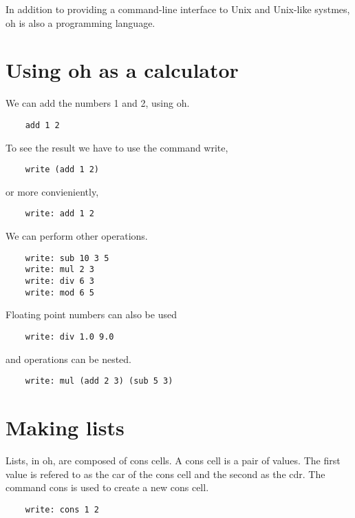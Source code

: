 \documentclass[12pt]{book}
\begin{document}
In addition to providing a command-line interface to Unix and
Unix-like systmes, oh is also a programming language.


\section{Using oh as a calculator}

We can add the numbers 1 and 2, using oh.

\begin{lstlisting}
	add 1 2
\end{lstlisting}

To see the result we have to use the command write,

\begin{lstlisting}
	write (add 1 2)
\end{lstlisting}

or more convieniently,

\begin{lstlisting}
	write: add 1 2
\end{lstlisting}

We can perform other operations.

\begin{lstlisting}
	write: sub 10 3 5
	write: mul 2 3
	write: div 6 3
	write: mod 6 5
\end{lstlisting}

Floating point numbers can also be used

\begin{lstlisting}
	write: div 1.0 9.0
\end{lstlisting}

and operations can be nested.

\begin{lstlisting}
	write: mul (add 2 3) (sub 5 3)
\end{lstlisting}


\section{Making lists}

Lists, in oh, are composed of cons cells. A cons cell is a pair of
values. The first value is refered to as the car of the cons cell and
the second as the cdr. The command cons is used to create a new cons
cell.

\begin{lstlisting}
	write: cons 1 2
\end{lstlisting}
\end{document}
